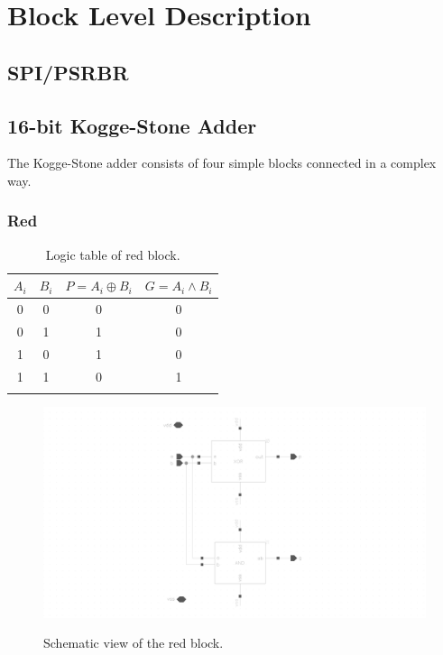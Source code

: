 \section{Block Level Description}

\subsection{SPI/PSRBR}

\subsection{16-bit Kogge-Stone Adder}
The Kogge-Stone adder consists of four simple blocks connected in a complex way. 

\noindent {}

\subsubsection{Red}

\begin{table}[H]
  \caption{Logic table of red block.}
  \centering
  \begin{tabular}{cc|cc}
    \toprule
    $A_i$ & $B_i$ & $P=A_i \oplus B_i$ & $G=A_i \wedge B_i$ \\
    \midrule
    0 & 0 & 0 & 0 \\
    0 & 1 & 1 & 0 \\
    1 & 0 & 1 & 0 \\
    1 & 1 & 0 & 1 \\
    \bottomrule
    \label{tab:red}
  \end{tabular}
\end{table}

\begin{figure}[H]
  \centering
  \captionsetup{justification=centering}
  {\includegraphics[width=2.0\textwidth]{../figures/red}}
  \caption{Schematic view of the red block.} \label{fig:red}
\end{figure}


